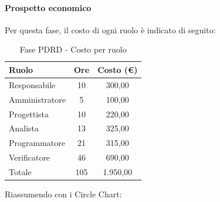\documentclass[../PianoProgetto.tex]{subfiles}
\begin{document}
	\paragraph{Prospetto economico}
					Per questa fase, il costo di ogni ruolo è indicato di seguito:
	\begin{table}[h]
		\centering
	
		\begin{tabular}{l * {2}{c}}
			\toprule
			\textbf{Ruolo} & \textbf{Ore} & \textbf{Costo (\euro{})} \\
			\midrule
			Responsabile &	10 & 300,00 \\
			Amministratore & 5 & 100,00 \\
			Progettista & 10 & 220,00 \\
			Analista & 13 & 325,00 \\
			Programmatore & 21 & 315,00 \\
			Verificatore & 46 & 690,00 \\
			\midrule		
			Totale & 105 & 1.950,00 \\
			\bottomrule
		\end{tabular}
		\caption{Fase PDRD - Costo per ruolo}
		\label{tab:fasePDRD_costo}
	\end{table}
\vfill	
	Riassumendo con i Circle Chart:
\end{document}
